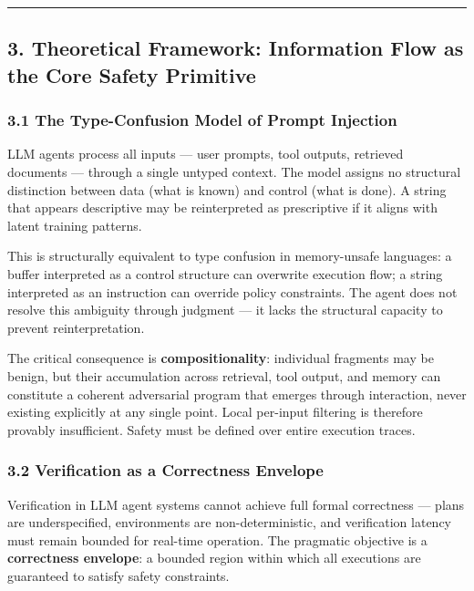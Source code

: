\documentclass[
]{article}
\begin{document}
\begin{center}\rule{0.5\linewidth}{0.5pt}\end{center}

\subsection{3. Theoretical Framework: Information Flow as the Core
Safety
Primitive}\label{3-theoretical-framework-information-flow-as-the-core-safety-primitive}

\subsubsection{3.1 The Type-Confusion Model of Prompt
Injection}\label{31-the-type-confusion-model-of-prompt-injection}

LLM agents process all inputs --- user prompts, tool outputs, retrieved
documents --- through a single untyped context. The model assigns no
structural distinction between data (what is known) and control (what is
done). A string that appears descriptive may be reinterpreted as
prescriptive if it aligns with latent training patterns.

This is structurally equivalent to type confusion in memory-unsafe
languages: a buffer interpreted as a control structure can overwrite
execution flow; a string interpreted as an instruction can override
policy constraints. The agent does not resolve this ambiguity through
judgment --- it lacks the structural capacity to prevent
reinterpretation.

The critical consequence is \textbf{compositionality}: individual
fragments may be benign, but their accumulation across retrieval, tool
output, and memory can constitute a coherent adversarial program that
emerges through interaction, never existing explicitly at any single
point. Local per-input filtering is therefore provably insufficient.
Safety must be defined over entire execution traces.

\subsubsection{3.2 Verification as a Correctness
Envelope}\label{32-verification-as-a-correctness-envelope}

Verification in LLM agent systems cannot achieve full formal correctness
--- plans are underspecified, environments are non-deterministic, and
verification latency must remain bounded for real-time operation. The
pragmatic objective is a \textbf{correctness envelope}: a bounded region
within which all executions are guaranteed to satisfy safety
constraints.
\end{document}
